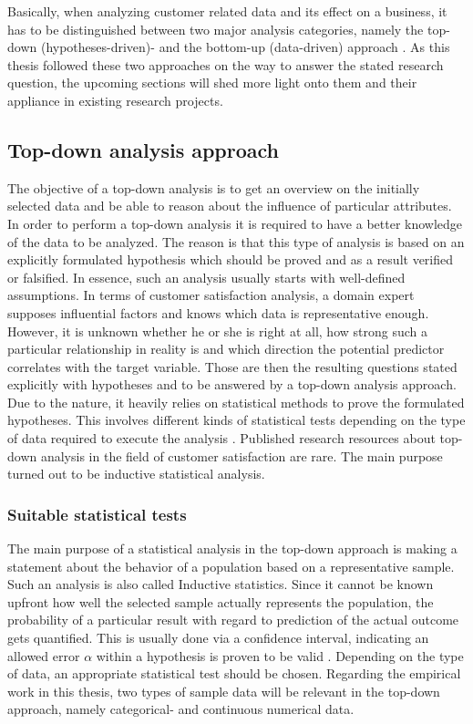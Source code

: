 Basically, when analyzing customer related data and its effect on a business, it has to be distinguished between two major analysis categories, namely the top-down (hypotheses-driven)- and the bottom-up (data-driven) approach \cite{neckel2015}. As this thesis followed these two approaches on the way to answer the stated research question, the upcoming sections will shed more light onto them and their appliance in existing research projects.

\subsection{Top-down analysis approach}
\label{ssec:topDown}
The objective of a top-down analysis is to get an overview on the initially selected data and be able to reason about the influence of particular attributes. In order to perform a top-down analysis it is required to have a better knowledge of the data to be analyzed. The reason is that this type of analysis is based on an explicitly formulated hypothesis which should be proved and as a result verified or falsified. In essence, such an analysis usually starts with well-defined assumptions. In terms of customer satisfaction analysis, a domain expert supposes influential factors and knows which data is representative enough. However, it is unknown whether he or she is right at all, how strong such a particular relationship in reality is and which direction the potential predictor correlates with the target variable. Those are then the resulting questions stated explicitly with hypotheses and to be answered by a top-down analysis approach. Due to the nature, it heavily relies on statistical methods to prove the formulated hypotheses. This involves different kinds of statistical tests depending on the type of data required to execute the analysis \cite{neckel2015}. Published research resources about top-down analysis in the field of customer satisfaction are rare. The main purpose turned out to be inductive statistical analysis. 

\subsubsection{Suitable statistical tests}
The main purpose of a statistical analysis in the top-down approach is making a statement about the behavior of a population based on a representative sample. Such an analysis is also called Inductive statistics. Since it cannot be known upfront how well the selected sample actually represents the population, the probability of a particular result with regard to prediction of the actual outcome gets quantified. This is usually done via a confidence interval, indicating an allowed error $\alpha$ within a hypothesis is proven to be valid \cite{oestreich2009keine}. Depending on the type of data, an appropriate statistical test should be chosen. Regarding the empirical work in this thesis, two types of sample data will be relevant in the top-down approach, namely categorical- and continuous numerical data. 

